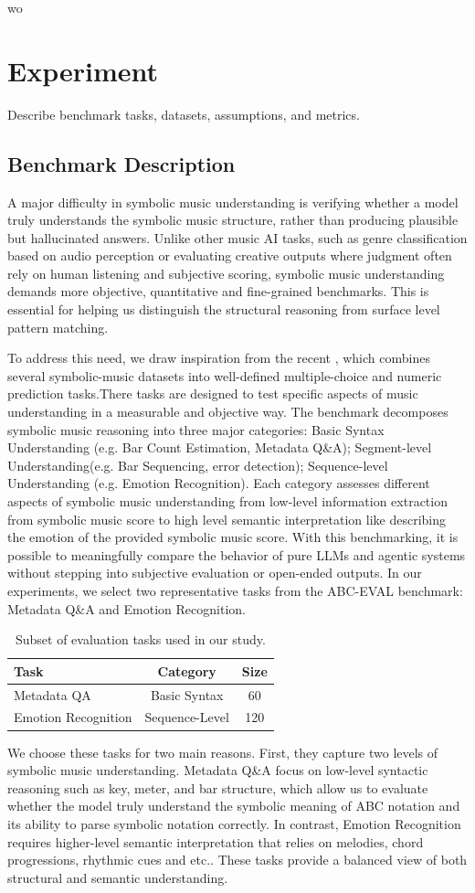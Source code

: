 wo\documentclass[sigconf]{acmart}
\begin{document}
\section{Experiment}
Describe benchmark tasks, datasets, assumptions, and metrics.
\subsection{Benchmark Description}
A major difficulty in symbolic music understanding is verifying whether a model truly understands the symbolic music structure, rather than producing plausible but hallucinated answers. Unlike other music AI tasks, such as genre classification based on audio perception or evaluating creative outputs where judgment often rely on human listening and subjective scoring, symbolic music understanding demands more objective, quantitative and fine-grained benchmarks. This is essential for helping us distinguish the structural reasoning from surface level pattern matching. 

To address this need, we draw inspiration from the recent \citet{zhaoABCEvalBenchmarkingLarge2025}, which combines several symbolic-music datasets into well-defined multiple-choice and numeric prediction tasks.There tasks are designed to test specific aspects of music understanding in a measurable and objective way. The benchmark decomposes symbolic music reasoning into three major categories: Basic Syntax Understanding (e.g. Bar Count Estimation, Metadata  Q\&A); Segment-level Understanding(e.g. Bar Sequencing, error detection); Sequence-level Understanding (e.g. Emotion Recognition). Each category assesses different aspects of symbolic music understanding from low-level information extraction from symbolic music score to high level semantic interpretation like describing the emotion of the provided symbolic music score.  With this benchmarking, it is possible to meaningfully compare the behavior of pure LLMs and agentic systems without stepping into subjective evaluation or open-ended outputs.  In our experiments, we select two representative tasks from the ABC-EVAL benchmark: Metadata Q\&A and Emotion Recognition. 
\begin{table}[h]
\centering
\begin{tabular}{lcc}
\toprule
Task & Category & Size \\
\midrule
Metadata QA & Basic Syntax & 60 \\
Emotion Recognition & Sequence-Level & 120 \\
\bottomrule
\end{tabular}
\caption{Subset of evaluation tasks used in our study.}
\label{tab:tasks}
\end{table}
We choose these tasks for two main reasons. First, they capture two levels of symbolic music understanding. Metadata Q\&A focus on low-level syntactic reasoning such as key, meter, and bar structure, which allow us to evaluate whether the model truly understand the symbolic meaning of ABC notation and its ability to parse symbolic notation correctly. In contrast, Emotion Recognition requires higher-level semantic interpretation that relies on melodies, chord progressions, rhythmic cues and etc.. These tasks provide a balanced view of both structural and semantic understanding. 
\end{document}
